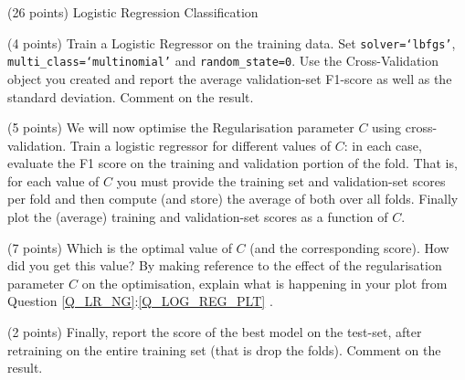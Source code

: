 \documentclass[12pt]{article}
\begin{document}
\begin{question}{(26 points) Logistic Regression Classification}
\begin{subquestion}{(4 points) Train a Logistic Regressor on the training data. Set \texttt{solver=`lbfgs'}, \texttt{multi\_class=`multinomial'} and \texttt{random\_state=0}. Use the Cross-Validation object you created and report the average validation-set F1-score as well as the standard deviation. Comment on the result.}






\end{subquestion}

\begin{subquestion}{\label{Q_LOG_REG_PLT}(5 points) We will now optimise the Regularisation parameter $C$ using cross-validation. Train a logistic regressor for different values of $C$: in each case, evaluate the F1 score on the training and validation portion of the fold. That is, for each value of $C$ you must provide the training set and validation-set scores per fold and then compute (and store) the average of both over all folds. Finally plot the (average) training and validation-set scores as a function of $C$. }






\end{subquestion}

\begin{subquestion}{(7 points) Which is the optimal value of $C$ (and the corresponding score). How did you get this value? By making reference to the effect of the regularisation parameter $C$ on the optimisation, explain what is happening in your plot from Question \ref{Q_LR_NG}:\ref{Q_LOG_REG_PLT} .}






\end{subquestion}

\begin{subquestion}{(2 points) Finally, report the score of the best model on the test-set, after retraining on the entire training set (that is drop the folds).  Comment on the result.}






\end{subquestion}


\end{question}
\end{document}
